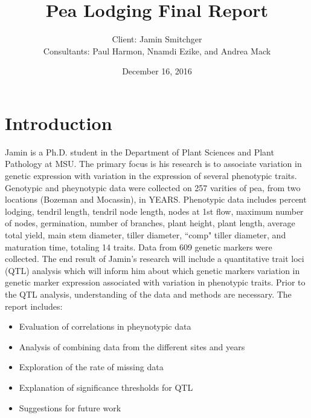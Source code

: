 \documentclass[11pt]{article}
\title{Pea Lodging Final Report}
\author{Client: Jamin Smitchger\\
Consultants: Paul Harmon, Nnamdi Ezike, and Andrea Mack}
\date{December 16, 2016}
\begin{document}
\maketitle





\section{Introduction}
Jamin is a Ph.D. student in the Department of Plant Sciences and Plant Pathology at MSU. The primary focus is his research is to associate variation in genetic expression with variation in the expression of several phenotypic traits. Genotypic and pheynotypic data were collected on 257 varities of pea, from two locations (Bozeman and Mocassin), in YEARS. Phenotypic data includes percent lodging, tendril length, tendril node length, nodes at 1st flow, maximum number of nodes, germination, number of branches, plant height, plant length, average total yield, main stem diameter, tiller diameter, ``comp" tiller diameter, and maturation time, totaling 14 traits. Data from 609 genetic markers were collected. The end result of Jamin's research will include a quantitative trait loci (QTL) analysis which will inform him about which genetic markers variation in genetic marker expression associated with variation in phenotypic traits. Prior to the QTL analysis, understanding of the data and methods are necessary. The report includes:

\begin{itemize}

\item Evaluation of correlations in pheynotypic data

\item Analysis of combining data from the different sites and years

\item Exploration of the rate of missing data

\item Explanation of significance thresholds for QTL 

\item Suggestions for future work
\end{itemize}
\end{document}
